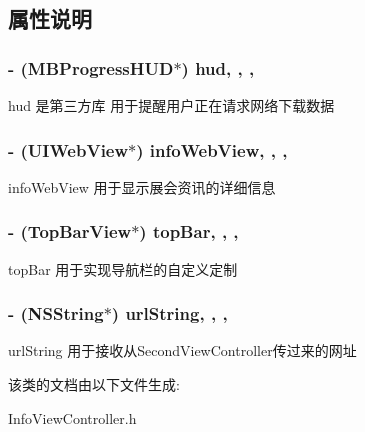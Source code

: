 \subsection{属性说明}
\hypertarget{interface_info_view_controller_a1a2a712f0824f338296c51f09088d50a}{
\subsubsection[{hud}]{\setlength{\rightskip}{0pt plus 5cm}-\/ ({\bf M\-B\-Progress\-H\-U\-D}$\ast$) hud\hspace{0.3cm}{\ttfamily [read]}, {\ttfamily [write]}, {\ttfamily [nonatomic]}, {\ttfamily [retain]}}}\label{interface_info_view_controller_a1a2a712f0824f338296c51f09088d50a}
hud 是第三方库 用于提醒用户正在请求网络下载数据 \hypertarget{interface_info_view_controller_a34d0ec0083fd66336b41a8393e51f91d}{
\subsubsection[{info\-Web\-View}]{\setlength{\rightskip}{0pt plus 5cm}-\/ (U\-I\-Web\-View$\ast$) info\-Web\-View\hspace{0.3cm}{\ttfamily [read]}, {\ttfamily [write]}, {\ttfamily [nonatomic]}, {\ttfamily [retain]}}}\label{interface_info_view_controller_a34d0ec0083fd66336b41a8393e51f91d}
info\-Web\-View 用于显示展会资讯的详细信息 \hypertarget{interface_info_view_controller_a047156b12d76ef4fbf44a13eb499a887}{
\subsubsection[{top\-Bar}]{\setlength{\rightskip}{0pt plus 5cm}-\/ ({\bf Top\-Bar\-View}$\ast$) top\-Bar\hspace{0.3cm}{\ttfamily [read]}, {\ttfamily [write]}, {\ttfamily [nonatomic]}, {\ttfamily [retain]}}}\label{interface_info_view_controller_a047156b12d76ef4fbf44a13eb499a887}
top\-Bar 用于实现导航栏的自定义定制 \hypertarget{interface_info_view_controller_affc65776e53e867683a286f3c86384e9}{
\subsubsection[{url\-String}]{\setlength{\rightskip}{0pt plus 5cm}-\/ (N\-S\-String$\ast$) url\-String\hspace{0.3cm}{\ttfamily [read]}, {\ttfamily [write]}, {\ttfamily [nonatomic]}, {\ttfamily [copy]}}}\label{interface_info_view_controller_affc65776e53e867683a286f3c86384e9}
url\-String 用于接收从\-Second\-View\-Controller传过来的网址 

该类的文档由以下文件生成\-:\begin{DoxyCompactItemize}
\item 
Info\-View\-Controller.\-h\end{DoxyCompactItemize}
